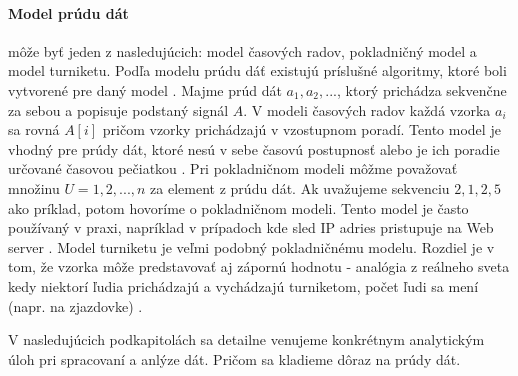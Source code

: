 \paragraph{Model prúdu dát} môže byť jeden z nasledujúcich: model časových radov, pokladničný model a model turniketu. Podľa modelu prúdu dáť existujú príslušné algoritmy, ktoré boli vytvorené pre daný model \citep{tran2014change}. Majme prúd dát $a_1, a_2, ...$, ktorý prichádza sekvenčne za sebou a popisuje podstaný signál $A$. 
V modeli časových radov každá vzorka $a_i$ sa rovná $A[i]$ pričom vzorky prichádzajú v vzostupnom poradí. Tento model je vhodný pre prúdy dát, ktoré nesú v sebe časovú postupnosť alebo je ich poradie určované časovou pečiatkou \citep{muthukrishnan2005data}.
Pri pokladničnom modeli môžme považovať množinu $U = {1, 2, ..., n}$ za element z prúdu dát. Ak uvažujeme sekvenciu $2, 1, 2, 5$ ako príklad, potom hovoríme o pokladničnom modeli. Tento model je často používaný v praxi, napríklad v prípadoch kde sled IP adries pristupuje na Web server \citep{ikonomovska2013algorithmic, muthukrishnan2005data}.
Model turniketu je veľmi podobný pokladničnému modelu. Rozdiel je v tom, že vzorka môže predstavovať aj zápornú hodnotu - analógia z reálneho sveta kedy niektorí ľudia prichádzajú a vychádzajú turniketom, počet ľudi sa mení (napr. na zjazdovke) \citep{ikonomovska2013algorithmic, muthukrishnan2005data}.

\par
V nasledujúcich podkapitolách sa detailne venujeme konkrétnym analytickým úloh pri spracovaní a anlýze dát. Pričom sa kladieme dôraz na prúdy dát.



